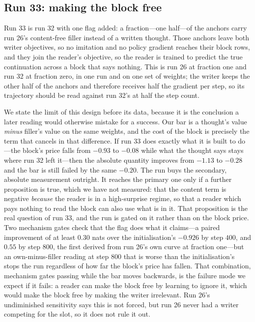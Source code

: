 \documentclass{article} %
\begin{document}
\subsection{Run 33: making the block free}
\label{sec:run33}

Run 33 is run 32 with one flag added: a fraction---one half---of the anchors carry run 26's
content-free filler instead of a written thought. Those anchors leave both writer objectives, so no
imitation and no policy gradient reaches their block rows, and they join the reader's objective, so
the reader is trained to predict the true continuation across a block that says nothing. This is run
26 at fraction one and run 32 at fraction zero, in one run and on one set of weights; the writer
keeps the other half of the anchors and therefore receives half the gradient per step, so its
trajectory should be read against run 32's at half the step count.

We state the limit of this design before its data, because it is the conclusion a later reading
would otherwise mistake for a success. Our bar is a thought's value \emph{minus} filler's value on
the same weights, and the cost of the block is precisely the term that cancels in that difference.
If run 33 does exactly what it is built to do---the block's price falls from $-0.93$ to $-0.08$ while
what the thought says stays where run 32 left it---then the absolute quantity improves from $-1.13$
to $-0.28$ and the bar is still failed by the same $-0.20$. The run buys the secondary,
absolute measurement outright. It reaches the primary one only if a further proposition is true,
which we have not measured: that the content term is negative \emph{because} the reader is in a
high-surprise regime, so that a reader which pays nothing to read the block can also use what is in
it. That proposition is the real question of run 33, and the run is gated on it rather than on the
block price. Two mechanism gates check that the flag does what it claims---a paired improvement of
at least $0.30$ nats over the initialisation's $-0.926$ by step $400$, and $0.55$ by step $800$,
the first derived from run 26's own curve at fraction one---but an own-minus-filler reading at step
$800$ that is worse than the initialisation's stops the run regardless of how far the block's price
has fallen. That combination, mechanism gates passing while the bar moves backwards, is the failure
mode we expect if it fails: a reader can make the block free by learning to ignore it, which would
make the block free by making the writer irrelevant. Run 26's undiminished sensitivity says this is
not forced, but run 26 never had a writer competing for the slot, so it does not rule it out.
\end{document}
